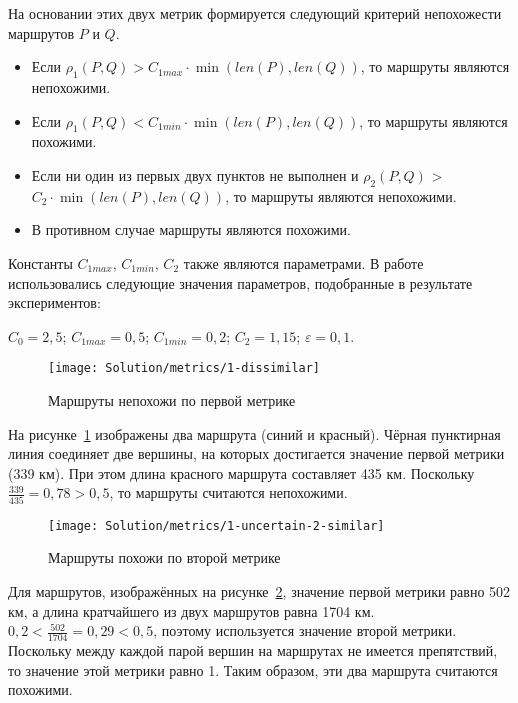 На основании этих двух метрик формируется следующий критерий
непохожести маршрутов $P$ и $Q$.
\begin{itemize}
  \item Если $\rho_1(P, Q) > C_{1max} \cdot \min(len(P), len(Q))$, то
    маршруты являются непохожими.
  \item Если $\rho_1(P, Q) < C_{1min} \cdot \min(len(P), len(Q))$, то
    маршруты являются похожими.
  \item Если ни один из первых двух пунктов не выполнен и $\rho_2(P,
    Q)$ > $C_2 \cdot \min(len(P), len(Q))$, то маршруты являются непохожими.

  \item В противном случае маршруты являются похожими.
\end{itemize}

Константы $C_{1max}$, $C_{1min}$, $C_2$ также являются параметрами. В
работе использовались следующие значения параметров, подобранные в результате экспериментов:

$C_0 = 2,5$; $C_{1max} = 0,5$; $C_{1min} = 0,2$; $C_2 = 1,15$;
$\varepsilon = 0,1$.

\begin{figure}
    \texttt{[image: Solution/metrics/1-dissimilar]}
    \caption{Маршруты непохожи по первой метрике}
    \label{fig:1-dissimilar}
\end{figure}

На рисунке~\ref{fig:1-dissimilar} изображены два маршрута (синий и
красный). Чёрная пунктирная линия соединяет две вершины, на которых
достигается значение первой метрики (339 км). При этом длина красного
маршрута составляет 435 км. Поскольку $\frac{339}{435} = 0,78 > 0,5$,
то маршруты считаются непохожими.

\begin{figure}
    \texttt{[image: Solution/metrics/1-uncertain-2-similar]}
    \caption{Маршруты похожи по второй метрике}
    \label{fig:1-uncertain-2-similar}
\end{figure}

Для маршрутов, изображённых на
рисунке~\ref{fig:1-uncertain-2-similar}, значение первой метрики равно
502 км, а длина кратчайшего из двух маршрутов равна 1704 км. $0,2 <
\frac{502}{1704} = 0,29 < 0,5$, поэтому используется значение второй метрики.
Поскольку между каждой парой вершин на маршрутах не имеется
препятствий, то значение этой метрики равно 1. Таким образом, эти два
маршрута считаются похожими.

